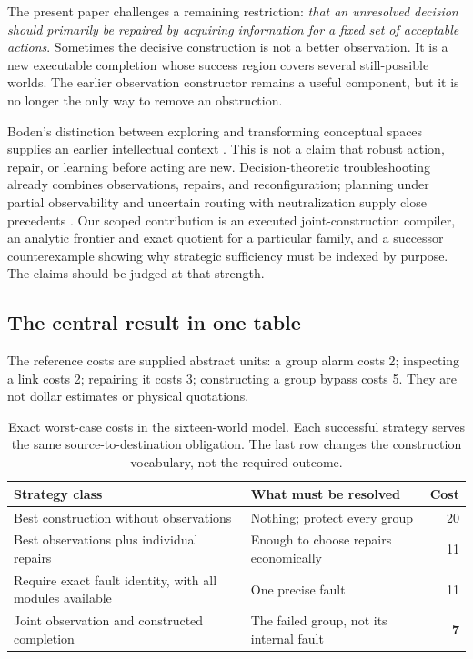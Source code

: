 \documentclass[11pt,letterpaper]{article}
\theoremstyle{remark}\newtheorem{remark}{Remark}[section]
\begin{document}
The present paper challenges a remaining restriction: \emph{that an unresolved decision should primarily be repaired by acquiring information for a fixed set of acceptable actions}. Sometimes the decisive construction is not a better observation. It is a new executable completion whose success region covers several still-possible worlds. The earlier observation constructor remains a useful component, but it is no longer the only way to remove an obstruction.

Boden's distinction between exploring and transforming conceptual spaces supplies an earlier intellectual context \citep{boden}. This is not a claim that robust action, repair, or learning before acting are new. Decision-theoretic troubleshooting already combines observations, repairs, and reconfiguration; planning under partial observability and uncertain routing with neutralization supply close precedents \citep{breese,kaelbling,traveler}. Our scoped contribution is an executed joint-construction compiler, an analytic frontier and exact quotient for a particular family, and a successor counterexample showing why strategic sufficiency must be indexed by purpose. The claims should be judged at that strength.

\subsection{The central result in one table}
The reference costs are supplied abstract units: a group alarm costs 2; inspecting a link costs 2; repairing it costs 3; constructing a group bypass costs 5. They are not dollar estimates or physical quotations.

\begin{table}[htbp]\centering\small
\caption{Exact worst-case costs in the sixteen-world model. Each successful strategy serves the same source-to-destination obligation. The last row changes the construction vocabulary, not the required outcome.}\label{tab:hero}
\begin{tabularx}{\linewidth}{@{}YP{.36\linewidth}r@{}}\toprule
Strategy class & What must be resolved & Cost\\\midrule
Best construction without observations & Nothing; protect every group & 20\\
Best observations plus individual repairs & Enough to choose repairs economically & 11\\
Require exact fault identity, with all modules available & One precise fault & 11\\
Joint observation and constructed completion & The failed group, not its internal fault & \textbf{7}\\\bottomrule
\end{tabularx}
\end{table}
\end{document}
